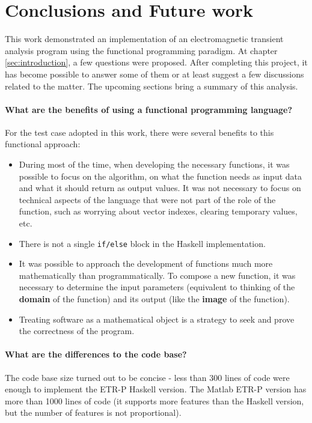 \chapter{ Conclusions and Future work }
\label{conclusions}

This work demonstrated an implementation of an electromagnetic transient analysis program using the functional programming paradigm.  At chapter \ref{sec:introduction}, a few questions were proposed. After completing this project, it has become possible to answer some of them or at least suggest a few discussions related to the matter. The upcoming sections bring a summary of this analysis.

\subsubsection{What are the benefits of using a functional programming language? }

For the test case adopted in this work, there were several benefits to this functional approach:

\begin{itemize}
\item During most of the time, when developing the necessary functions,  it was possible to focus on the algorithm, on what the function needs as input data and what it should return as output values. It was not necessary to focus on technical aspects of the language that were not part of the role of the function, such as worrying about vector indexes, clearing temporary values, etc. 
\item There is not a single \lstinline!if/else! block in the Haskell implementation.
\item It was possible to approach the development of functions much more mathematically than programmatically. To compose a new function, it was necessary to determine the input parameters (equivalent to thinking of the \textbf{domain} of the function) and its output (like the \textbf{image} of the function). 
\item Treating software as a mathematical object is a strategy to seek and prove the correctness of the program.
\end{itemize}


\subsubsection{What are the differences to the code base?}


The code base size turned out to be concise - less than 300 lines of code were enough to implement the ETR-P Haskell version. The Matlab ETR-P version has more than 1000 lines of code (it supports more features than the Haskell version, but the number of features is not proportional).

